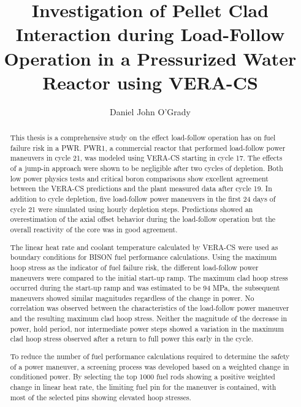 \documentclass[edeposit,fullpage,11pt]{uiucthesis2009}
\begin{document}
\title{Investigation of Pellet Clad Interaction during Load-Follow\\
       Operation in a Pressurized Water Reactor using VERA-CS}
\author{Daniel John O'Grady}
\msthesis
{}
\maketitle

\frontmatter

\begin{abstract}
This thesis is a comprehensive study on the effect load-follow operation has on fuel failure risk in a PWR. 
PWR1, a commercial reactor that performed load-follow power maneuvers in cycle 21, was modeled using VERA-CS starting in cycle 17. 
The effects of a jump-in approach were shown to be negligible after two cycles of depletion.
Both low power physics tests and critical boron comparisons show excellent agreement between the VERA-CS predictions and the plant measured data after cycle 19.
In addition to cycle depletion, five load-follow power maneuvers in the first 24 days of cycle 21 were simulated using hourly depletion steps. 
Predictions showed an overestimation of the axial offset behavior during the load-follow operation but the overall reactivity of the core was in good agreement.

The linear heat rate and coolant temperature calculated by VERA-CS were used as boundary conditions for BISON fuel performance calculations.
Using the maximum hoop stress as the indicator of fuel failure risk, the different load-follow power maneuvers were compared to the initial start-up ramp.
The maximum clad hoop stress occurred during the start-up ramp and was estimated to be 94 MPa, the subsequent maneuvers showed similar magnitudes regardless of the change in power. 
No correlation was observed between the characteristics of the load-follow power maneuver and the resulting maximum clad hoop stress. 
Neither the magnitude of the decrease in power, hold period, nor intermediate power steps showed a variation in the maximum clad hoop stress observed after a return to full power this early in the cycle.

To reduce the number of fuel performance calculations required to determine the safety of a power maneuver, a screening process was developed based on a weighted change in conditioned power.
By selecting the top 1000 fuel rods showing a positive weighted change in linear heat rate, the limiting fuel pin for the maneuver is contained, with most of the selected pins showing elevated hoop stresses. 
\end{abstract}
\end{document}
